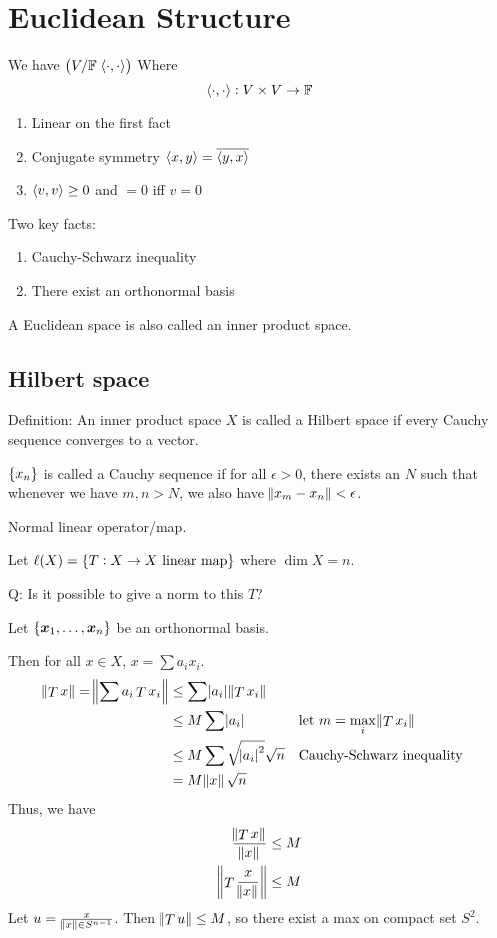 \documentclass{article}
\DeclarePairedDelimiter\ip{\langle }{\rangle}
\begin{document}
\section{Euclidean Structure}
We have \(\del{V/\mathbb{F}\;\ip{\cdot,\cdot}}\)
Where
\[\ip{\cdot, \cdot}: V \times V \to \mathbb{F}\]
\begin{enumerate}
\item Linear on the first fact
\item Conjugate symmetry \(\ip{x, y} = \overline{\ip{y, x}}\)
\item \(\ip{v, v} \geq 0\) and \(=0\) iff \(v = 0\)
\end{enumerate}
Two key facts:
\begin{enumerate}
\item Cauchy-Schwarz inequality
\item There exist an orthonormal basis
\end{enumerate}

A Euclidean space is also called an inner product space.

\subsection{Hilbert space}

Definition: An inner product space \(X\) is called a Hilbert space if every Cauchy sequence converges to a vector.
\begin{aside}[Definition:]
  \(\set{x_n}\) is called a Cauchy sequence if for all \(\epsilon > 0\), there exists an \(N\) such that whenever we have \(m, n > N\), we also have \(\norm{x_m - x_n} < \epsilon\).
\end{aside}

Normal linear operator/map.

Let \(\ell(X) = \set{T: X \to X\text{ linear map}}\) where \(\dim X = n\).

Q: Is it possible to give a norm to this \(T\)?

Let \(\set{\bm  x_1, \dots, \bm x_n}\) be an orthonormal basis.

Then for all \(x \in X\), \(x = \sum a_i x_i\).
\begin{align*}
  \norm{\mathop{T}x} = \norm{\sum a_i \mathop{T}x_i}
  &\leq\sum{\abs{a_i}\norm{\mathop T x_i}}\\
  &\leq M\sum\abs{a_i} &&  \text{let \(m = \max_i \norm{\mathop T x_i} \)}\\
  &\leq M\sum \sqrt{\abs{a_i}^2}\sqrt{n}&& \text{Cauchy-Schwarz inequality}\\
  &=M\norm{x}\sqrt{n}
\end{align*}
Thus, we have
\begin{align*}
  \frac{\norm{\mathop T x}}{\norm x} &\leq M\\
  \norm{\mathop T \frac{x}{\norm{x}}} &\leq M
\end{align*}
Let \(u = \frac{x}{\norm{x} \in S^{n-1}}\).
Then \(\norm{\mathop T u} \leq M\), so there exist a max on compact set \(S^2\).
\end{document}
